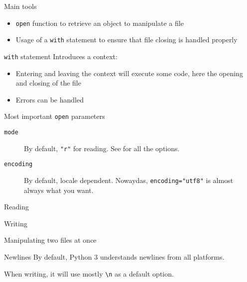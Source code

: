 \begin{frame}{Main tools}
  \begin{itemize}
    \item \texttt{open} function to retrieve an object to manipulate a file
    \item Usage of a \texttt{with} statement to ensure that file closing is handled properly
  \end{itemize}
\end{frame}

\begin{frame}{\texttt{with} statement}
  Introduces a context:
  \begin{itemize}
    \item Entering and leaving the context will execute some code, here the opening and closing of the file
    \item Errors can be handled
  \end{itemize}

\end{frame}

\begin{frame}{Most important \texttt{open} parameters}
  \begin{description}
    \item[\texttt{mode}] By default, \texttt{"r"} for reading. See  for all the options.
    \item[\texttt{encoding}] By default, locale dependent. Nowaydas, \texttt{encoding="utf8"} is almost always what you want.
  \end{description}
\end{frame}

\begin{frame}{Reading}
\end{frame}

\begin{frame}{Writing}
\end{frame}

\begin{frame}{Manipulating two files at once}
\end{frame}

\begin{frame}{Newlines}
  By default, Python 3 understands newlines from all platforms.

  When writing, it will use mostly \texttt{\textbackslash n} as a default option.
\end{frame}
